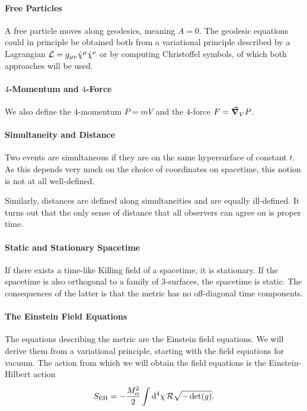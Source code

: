\paragraph{Free Particles}
A free particle moves along geodesics, meaning $A = 0$. The geodesic equations could in principle be obtained both from a variational principle described by a Lagrangian $\mathcal{L} = g_{\mu\nu}\dot{\chi}^{\mu}\dot{\chi}^{\nu}$ or by computing Christoffel symbols, of which both approaches will be used.

\paragraph{$4$-Momentum and $4$-Force}
We also define the $4$-momentum $P = mV$ and the $4$-force $F = \grad_{V}^{}{P}$.

\paragraph{Simultaneity and Distance}
Two events are simultaneous if they are on the same hypersurface of constant $t$. As this depends very much on the choice of coordinates on spacetime, this notion is not at all well-defined.

Similarly, distances are defined along simultaneities and are equally ill-defined. It turns out that the only sense of distance that all observers can agree on is proper time.

\paragraph{Static and Stationary Spacetime}
If there exists a time-like Killing field of a spacetime, it is stationary. If the spacetime is also orthogonal to a family of $3$-surfaces, the spacetime is static. The consequences of the latter is that the metric has no off-diagonal time components.

\paragraph{The Einstein Field Equations}
The equations describing the metric are the Einstein field equations. We will derive them from a variational principle, starting with the field equations for vacuum. The action from which we will obtain the field equations is the Einstein-Hilbert action
\begin{align*}
	S_{\text{EH}} = -\frac{M_{\alpha}^{2}}{2}\int\limits_{}^{}\dd[4]{\chi}\mathcal{R}\sqrt{-\det(g)}.
\end{align*}

